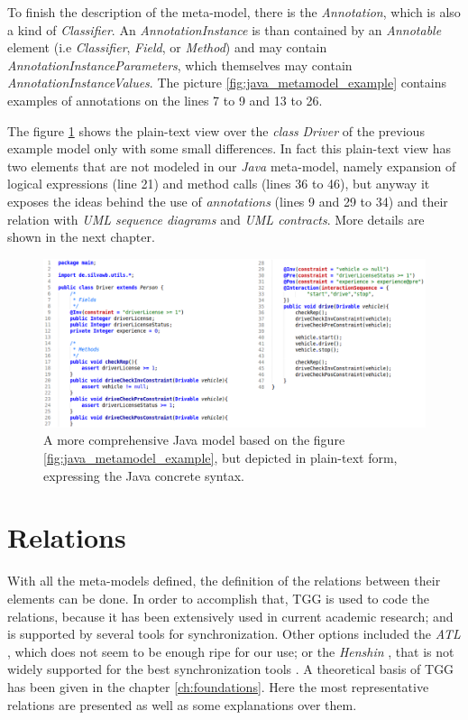 \documentclass[tuberlin,cic,tc,english,noabntcite]{iiufrgs}
\begin{document}
To finish the description of the meta-model, there is the \emph{Annotation}, which is also a kind of \emph{Classifier}. An \emph{AnnotationInstance} is than contained by an \emph{Annotable} element (i.e \emph{Classifier}, \emph{Field}, or \emph{Method}) and may contain \emph{AnnotationInstanceParameters}, which themselves may contain \emph{AnnotationInstanceValues}. The picture \ref{fig:java_metamodel_example} contains examples of annotations on the lines 7 to 9 and 13 to 26.

The figure \ref{fig:java_metamodel_example_text01} shows the plain-text view over the \emph{class} \emph{Driver} of the previous example model only with some small differences. In fact this plain-text view has two elements that are not modeled in our \emph{Java} meta-model, namely expansion of logical expressions (line 21) and method calls (lines 36 to 46), but anyway it exposes the ideas behind the use of \emph{annotations} (lines 9 and 29 to 34) and their relation with \emph{UML sequence diagrams} and \emph{UML contracts}. More details are shown in the next chapter.

\begin{figure}[h]
    \caption{A more comprehensive Java model based on the figure \ref{fig:java_metamodel_example}, but depicted in plain-text form, expressing the Java concrete syntax.}
    \begin{center}
        \includegraphics[width=\textwidth]{javaMetamodelExample01_Text}
    \end{center}
    \label{fig:java_metamodel_example_text01}
\end{figure}

\section{Relations}
With all the meta-models defined, the definition of the relations between their elements can be done. In order to accomplish that, TGG is used to code the relations, because it has been extensively used in current academic research; and is supported by several tools for synchronization. Other options included the \emph{ATL} \citep{jouault2008atl}, which does not seem to be enough ripe for our use; or the \emph{Henshin} \citep{arendt2010henshin}, that is not widely supported for the best synchronization tools \citep{hildebrandt2013survey}. A theoretical basis of TGG has been given in the chapter \ref{ch:foundations}. Here the most representative relations are presented as well as some explanations over them.
\end{document}
